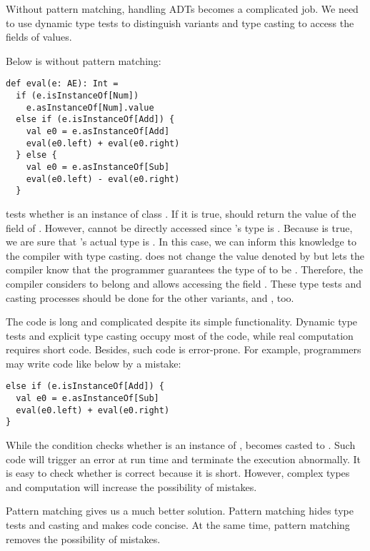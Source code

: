 Without pattern matching, handling ADTs becomes a complicated job. We need to
use dynamic type tests to distinguish variants and type casting to access the
fields of values.

Below is  without pattern matching:

\begin{verbatim}
def eval(e: AE): Int =
  if (e.isInstanceOf[Num])
    e.asInstanceOf[Num].value
  else if (e.isInstanceOf[Add]) {
    val e0 = e.asInstanceOf[Add]
    eval(e0.left) + eval(e0.right)
  } else {
    val e0 = e.asInstanceOf[Sub]
    eval(e0.left) - eval(e0.right)
  }
\end{verbatim}

 tests whether  is an instance of class
. If it is true,  should return the value of the field
 of . However,  cannot be directly accessed
since 's type is . Because  is true,
we are sure that 's actual type is . In this case, we can
inform this knowledge to the compiler with type casting. 
does not change the value denoted by  but lets the compiler know that
the programmer guarantees the type of  to be . Therefore, the
compiler considers  to belong  and allows
accessing the field . These type tests and casting processes should
be done for the other variants,  and , too.

The code is long and complicated despite its simple functionality. Dynamic type
tests and explicit type casting occupy most of the code, while real
computation requires short code. Besides, such code is error-prone.
For example, programmers may write code like below by a mistake:

\begin{verbatim}
else if (e.isInstanceOf[Add]) {
  val e0 = e.asInstanceOf[Sub]
  eval(e0.left) + eval(e0.right)
}
\end{verbatim}

While the condition checks whether  is an instance of ,
 becomes casted to . Such code will trigger an error at run
time and terminate the execution abnormally.
It is easy to check whether  is correct because it is short.
However, complex types and computation will increase the possibility of
mistakes.

Pattern matching gives us a much better solution. Pattern matching hides type
tests and casting and makes code concise. At the same time, pattern matching
removes the possibility of mistakes.

